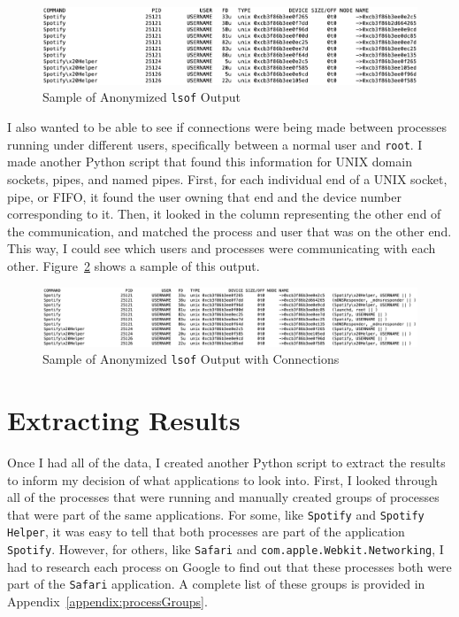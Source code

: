 \begin{figure}
\centering
\includegraphics[width=1\textwidth]{lsofAnon.png}
\caption{Sample of Anonymized \texttt{lsof} Output}
\label{fig:lsofAnon}
\end{figure}

I also wanted to be able to see if connections were being made between processes running under different users, specifically between a normal user and \texttt{root}.  I made another Python script that found this information for UNIX domain sockets, pipes, and named pipes.  First, for each individual end of a UNIX socket, pipe, or FIFO, it found the user owning that end and the device number corresponding to it.  Then, it looked in the column representing the other end of the communication, and matched the process and user that was on the other end.  This way, I could see which users and processes were communicating with each other.  Figure~\ref{fig:lsofConn} shows a sample of this output.

\begin{figure}
\centering
\includegraphics[width=1\textwidth]{lsofConn.png}
\caption{Sample of Anonymized \texttt{lsof} Output with Connections}
\label{fig:lsofConn}
\end{figure}

\section{Extracting Results}
\label{sec:extractResults}
Once I had all of the data, I created another Python script to extract the results to inform my decision of what applications to look into.  First, I  looked through all of the processes that were running and manually created groups of processes that were part of the same applications.  For some, like \texttt{Spotify} and \texttt{Spotify Helper}, it was easy to tell that both processes are part of the application \texttt{Spotify}.  However, for others, like \texttt{Safari} and \texttt{com.apple.Webkit.Networking}, I had to research each process on Google to find out that these processes both were part of the \texttt{Safari} application.  A complete list of these groups is provided in Appendix~\ref{appendix:processGroups}.

